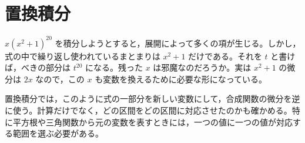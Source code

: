 \chapter{置換積分}\label{章:置換積分}

$x(x^2+1)^{20}$ を積分しようとすると，展開によって多くの項が生じる。しかし，式の中で繰り返し使われているまとまりは $x^2+1$ だけである。それを $t$ と書けば，べきの部分は $t^{20}$ になる。残った $x$ は邪魔なのだろうか。実は $x^2+1$ の微分は $2x$ なので，この $x$ も変数を換えるために必要な形になっている。

置換積分では，このように式の一部分を新しい変数にして，合成関数の微分を逆に使う。計算だけでなく，どの区間をどの区間に対応させたのかも確かめる。特に平方根や三角関数から元の変数を表すときには，一つの値に一つの値が対応する範囲を選ぶ必要がある。

%
%
%
%
%
%
%
